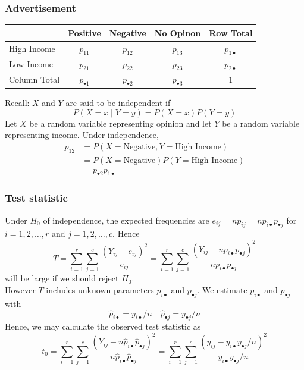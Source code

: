 \documentclass[a4paper]{article}
\begin{document}
\subsubsection{Advertisement}
\begin{table}[H]
	\centering
	\begin{tabular}{@{}lccc|c@{}}
	\toprule
				 & Positive  		   & Negative             & No Opinon           & Row Total           \\ \midrule
	High Income  & \( p_{11} \)		   & \( p_{12} \) 	      & \( p_{13} \) 	    & \( p_{1 \bullet} \) \\
	Low Income   & \( p_{21} \) 	   & \( p_{22} \) 	      & \( p_{23} \) 	    & \( p_{2 \bullet} \) \\ \midrule
	Column Total & \( p_{\bullet 1} \) & \( p_{\bullet 2} \)  & \( p_{\bullet 3} \) & \( 1 \) 			  \\ \bottomrule
	\end{tabular}
\end{table}
Recall: \( X \) and \( Y \) are said to be independent if
\[
	P(X = x \mid Y = y) = P(X = x)P(Y = y)
\]
Let \( X \)  be a random variable representing opinion and let \( Y \) be a random variable representing income. Under independence,
\begin{align*}
	p_{12} &= P(X = \text{Negative}, Y = \text{High Income})\\
	       &= P(X = \text{Negative}) P(Y = \text{High Income})\\
		   &= p_{\bullet 2} p_{1 \bullet}
\end{align*}
\subsubsection{Test statistic}
Under \( H_0 \) of independence, the expected frequencies are \( e_{ij} = np_{ij} = np_{i \bullet}p_{\bullet j} \) for \( i = 1,2,\dotsc,r \) and \( j = 1,2,\dotsc,c \). Hence
\[
	T = \sum_{i=1}^{r}\sum_{j=1}^{c} \frac{(Y_{ij}-e_{ij})^2}{e_{ij}} = \sum_{i=1}^{r}\sum_{j=1}^{c} \frac{(Y_{ij}-np_{i \bullet}p_{\bullet j})^2}{np_{i \bullet}p_{\bullet j}}
\]
will be large if we should reject \( H_0 \).\\
However \( T \) includes unknown parameters \( p_{i \bullet} \) and \( p_{\bullet j} \). We estimate \( p_{i \bullet} \) and \( p_{\bullet j} \) with
\[
	\hat{p}_{i \bullet} = y_{i \bullet}/n \quad \hat{p}_{\bullet j} = y_{\bullet j}/n
\]
Hence, we may calculate the observed test statistic as
\[
	t_0 = \sum_{i=1}^{r}\sum_{j=1}^{c} \frac{(Y_{ij}-n \hat{p}_{i \bullet}\hat{p}_{\bullet j})^2}{n \hat{p}_{i \bullet}\hat{p}_{\bullet j}} = \sum_{i=1}^{r}\sum_{j=1}^{c}\frac{(y_{ij} - y_{i \bullet} y_{\bullet j}/n)^2}{y_{i \bullet}y_{\bullet j}/n}
\]
\end{document}
